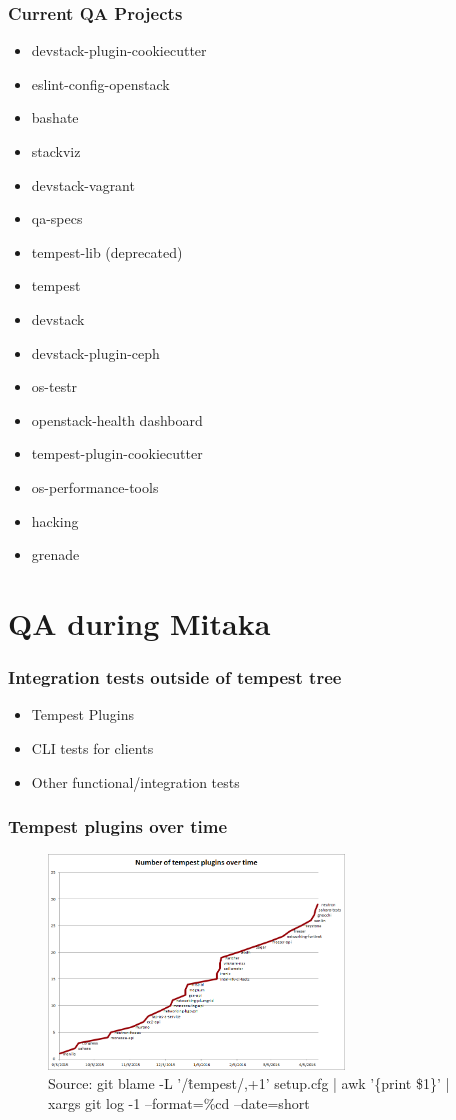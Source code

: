 \documentclass[aspectratio=169,11pt,hyperref={colorlinks=true}]{beamer}
\begin{document}
\begin{frame}
    \frametitle{Current QA Projects}
    \begin{itemize}
        \item{devstack-plugin-cookiecutter}
        \item{eslint-config-openstack}
        \item{bashate}
        \item{stackviz}
        \item{devstack-vagrant}
        \item{qa-specs}
        \item{tempest-lib (deprecated)}
        \item{tempest}
        \item{devstack}
        \item{devstack-plugin-ceph}
        \item{os-testr}
        \item{openstack-health dashboard}
        \item{tempest-plugin-cookiecutter}
        \item{os-performance-tools}
        \item{hacking}
        \item{grenade}
    \end{itemize}
\end{frame}

\section{QA during Mitaka}
\begin{frame}
    \frametitle{Integration tests outside of tempest tree}
    \begin{itemize}
        \item{Tempest Plugins}
        \item{CLI tests for clients}
        \item{Other functional/integration tests}
    \end{itemize}
\end{frame}

\begin{frame}
    \frametitle{Tempest plugins over time}
    \begin{figure}[p]
    	\centering
    	\includegraphics[width=0.7\textwidth]{tempest-plugins.png}
        \caption{Source: git blame -L '/\^tempest/,+1' setup.cfg | awk '\{print \$1\}' | xargs git log -1 --format=\%cd --date=short}
    \end{figure}
\end{frame}
\end{document}
